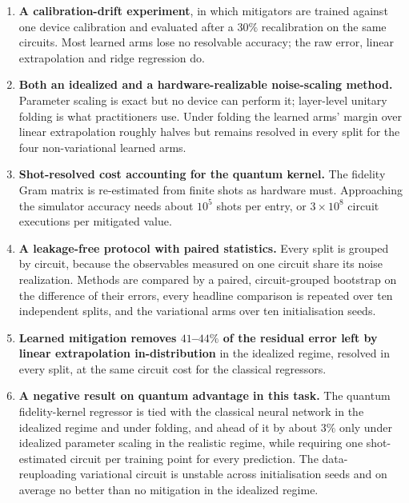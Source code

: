 \documentclass[Thesis.tex]{subfiles}
\begin{document}
\begin{enumerate}
    \item \textbf{A calibration-drift experiment}, in which mitigators are trained
    against one device calibration and evaluated after a $30\%$ recalibration on the
    same circuits. Most learned arms lose no resolvable accuracy; the raw error,
    linear extrapolation and ridge regression do.

    \item \textbf{Both an idealized and a hardware-realizable noise-scaling method.}
    Parameter scaling is exact but no device can perform it; layer-level unitary
    folding is what practitioners use. Under folding the learned arms' margin over
    linear extrapolation roughly halves but remains resolved in every split for the
    four non-variational learned arms.

    \item \textbf{Shot-resolved cost accounting for the quantum kernel.} The fidelity
    Gram matrix is re-estimated from finite shots as hardware must. Approaching the
    simulator accuracy needs about $10^5$ shots per entry, or $3 \times 10^8$ circuit
    executions per mitigated value.

    \item \textbf{A leakage-free protocol with paired statistics.} Every split is
    grouped by circuit, because the observables measured on one circuit share its
    noise realization. Methods are compared by a paired, circuit-grouped bootstrap on
    the difference of their errors, every headline comparison is repeated over ten
    independent splits, and the variational arms over ten initialisation seeds.

    \item \textbf{Learned mitigation removes $41$--$44\%$ of the residual error left
    by linear extrapolation in-distribution} in the idealized regime, resolved in
    every split, at the same circuit cost for the classical regressors.

    \item \textbf{A negative result on quantum advantage in this task.} The quantum
    fidelity-kernel regressor is tied with the classical neural network in the
    idealized regime and under folding, and ahead of it by about $3\%$ only under
    idealized parameter scaling in the realistic regime, while requiring one
    shot-estimated circuit per training point for every prediction. The
    data-reuploading variational circuit is unstable across initialisation seeds and
    on average no better than no mitigation in the idealized regime.


\end{enumerate}
\end{document}
